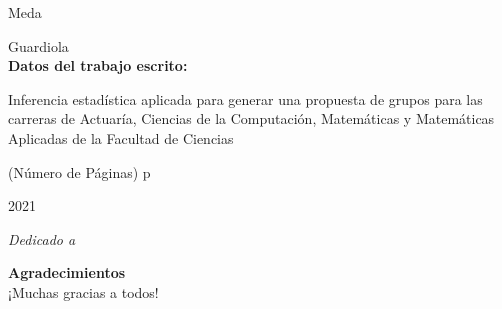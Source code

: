 {Meda 

Guardiola\\

\textbf{Datos del trabajo escrito:}

Inferencia estadística aplicada para generar una propuesta de grupos para las carreras de Actuaría, Ciencias de la Computación, Matemáticas y Matemáticas Aplicadas de la Facultad de Ciencias

(Número de Páginas) p

2021
}






\newpage %
\thispagestyle{empty} %

\begin{flushright}
\textit{Dedicado a \\}
\end{flushright}

\newpage %
\thispagestyle{empty} %

\textbf{\Huge{Agradecimientos}}\\
 
¡Muchas gracias a todos!

\newpage %
\thispagestyle{empty} %

\tableofcontents %
\listoffigures %
\listoftables %
\lstlistoflistings %

